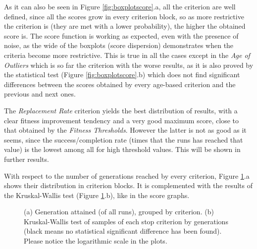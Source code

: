 \documentclass[runningheads,a4paper]{llncs}
\begin{document}
As it can also be seen in Figure \ref{fig:boxplotscore}.a, all the criterion are well defined, since all the scores grow in every criterion block, so as more restrictive the criterion is (they are met with a lower probability), the higher the obtained score is. The score function is working as expected, even with the presence of noise, as the wide of the boxplots (score dispersion) demonstrates when the criteria become more restrictive. This is true in all the cases except in the \textit{Age of Outliers} which is so far the criterion with the worse results, as it is also proved by the statistical test (Figure \ref{fig:boxplotscore}.b) which does not find significant differences between the scores obtained by every age-based criterion and the previous and next ones.

The \textit{Replacement Rate} criterion yields the best distribution of results, with a clear fitness improvement tendency and a very good maximum score, close to that obtained by the \textit{Fitness Thresholds}. However the latter is not as good as it seems, since the success/completion rate (times that the runs has reached that value) is the lowest among all for high threshold values. This will be shown in further results.

With respect to the number of generations reached by every criterion, Figure \ref{fig:boxplotgenerations}.a shows their distribution in criterion blocks. It is complemented with the results of the Kruskal-Wallis test (Figure \ref{fig:boxplotgenerations}.b), like in the score graphs.

\begin{figure}[h!tb]
\begin{center}
\end{center} 
\caption{(a) Generation attained (of all runs), grouped by criterion. (b) Kruskal-Wallis test of samples of each stop criterion by generations (black means no statistical significant difference has been found). Please notice the logarithmic scale in the plots.}
\label{fig:boxplotgenerations}
\end{figure}
\end{document}
